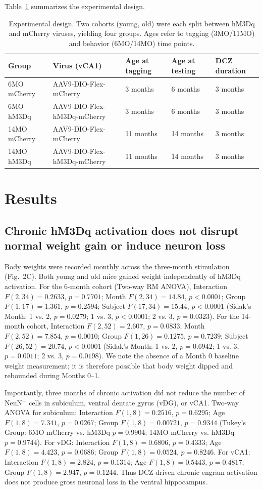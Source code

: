 \documentclass[11pt]{article}
\begin{document}
Table~\ref{tab:design} summarizes the experimental design.

\begin{table}[h]
\centering
\caption{Experimental design. Two cohorts (young, old) were each split between hM3Dq and mCherry viruses, yielding four groups. Ages refer to tagging (3MO/11MO) and behavior (6MO/14MO) time points.}
\label{tab:design}
\begin{tabular}{lllll}
\toprule
Group & Virus (vCA1) & Age at tagging & Age at testing & DCZ duration \\
\midrule
6MO mCherry & AAV9-DIO-Flex-mCherry   & 3 months  & 6 months  & 3 months \\
6MO hM3Dq   & AAV9-DIO-Flex-hM3Dq-mCherry & 3 months & 6 months  & 3 months \\
14MO mCherry & AAV9-DIO-Flex-mCherry  & 11 months & 14 months & 3 months \\
14MO hM3Dq   & AAV9-DIO-Flex-hM3Dq-mCherry & 11 months & 14 months & 3 months \\
\bottomrule
\end{tabular}
\end{table}

\section{Results}

\subsection{Chronic hM3Dq activation does not disrupt normal weight gain or induce neuron loss}
Body weights were recorded monthly across the three-month stimulation (Fig.~2C). Both young and old mice gained weight independently of hM3Dq activation. For the 6-month cohort (Two-way RM ANOVA), Interaction $F(2,34)=0.2633$, $p=0.7701$; Month $F(2,34)=14.84$, $p<0.0001$; Group $F(1,17)=1.361$, $p=0.2594$; Subject $F(17,34)=15.44$, $p<0.0001$ (Sidak's Month: 1 vs. 2, $p=0.0279$; 1 vs. 3, $p<0.0001$; 2 vs. 3, $p=0.0323$). For the 14-month cohort, Interaction $F(2,52)=2.607$, $p=0.0833$; Month $F(2,52)=7.854$, $p=0.0010$; Group $F(1,26)=0.1275$, $p=0.7239$; Subject $F(26,52)=20.74$, $p<0.0001$ (Sidak's Month: 1 vs. 2, $p=0.6942$; 1 vs. 3, $p=0.0011$; 2 vs. 3, $p=0.0198$). We note the absence of a Month 0 baseline weight measurement; it is therefore possible that body weight dipped and rebounded during Months 0--1.

Importantly, three months of chronic activation did not reduce the number of NeuN$^{+}$ cells in subiculum, ventral dentate gyrus (vDG), or vCA1. Two-way ANOVA for subiculum: Interaction $F(1,8)=0.2516$, $p=0.6295$; Age $F(1,8)=7.341$, $p=0.0267$; Group $F(1,8)=0.00721$, $p=0.9344$ (Tukey's Group: 6MO mCherry vs. hM3Dq $p=0.9904$; 14MO mCherry vs. hM3Dq $p=0.9744$). For vDG: Interaction $F(1,8)=0.6806$, $p=0.4333$; Age $F(1,8)=4.423$, $p=0.0686$; Group $F(1,8)=0.0524$, $p=0.8246$. For vCA1: Interaction $F(1,8)=2.824$, $p=0.1314$; Age $F(1,8)=0.5443$, $p=0.4817$; Group $F(1,8)=2.947$, $p=0.1244$. Thus DCZ-driven chronic engram activation does not produce gross neuronal loss in the ventral hippocampus.
\end{document}
